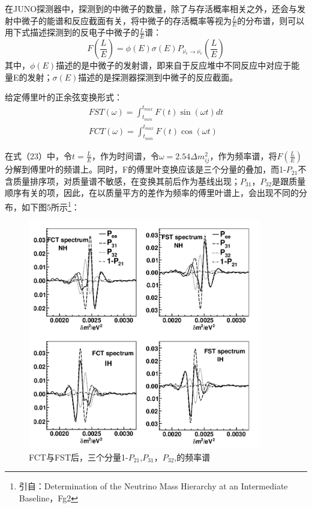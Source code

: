 \documentclass[10pt,a4paper]{article}
\begin{document}
在JUNO探测器中，探测到的中微子的数量，除了与存活概率相关之外，还会与发射中微子的能谱和反应截面有关，将中微子的存活概率等视为$\frac{L}{E}$的分布谱，则可以用下式描述探测到的反电子中微子的$\frac{L}{E}$谱：
\begin{equation}
F(\frac{L}{E})=\phi(E)\sigma(E)P_{\bar{\nu_e}\rightarrow\bar{\nu_e}}(\frac{L}{E})
\end{equation}
其中，$\phi(E)$描述的是中微子的发射谱，即来自于反应堆中不同反应中对应于能量E的发射；$\sigma(E)$描述的是探测器探测到中微子的反应截面。

给定傅里叶的正余弦变换形式：
\begin{equation}
\begin{split}
FST(\omega)=\int_{t_{min}}^{t_{max}}F(t)\sin(\omega t)dt\\
FCT(\omega)=\int_{t_{min}}^{t_{max}}F(t)\cos(\omega t)
\end{split}
\end{equation}


在式（23）中，令$t=\frac{L}{E}$，作为时间谱，令$\omega=2.54\Delta m_{ij}^2$，作为频率谱，将$F(\frac{L}{E})$分解到傅里叶的频谱上。同时，F的傅里叶变换应该是三个分量的叠加，而1-$P_{21}$不含质量排序项，对质量谱不敏感，在变换其前后作为基线出现；$P_{31}$，$P_{32}$是跟质量顺序有关的项，因此，在以质量平方的差作为频率的傅里叶谱上，会出现不同的分布，如下图5所示\footnote{引自：Determination of the Neutrino Mass Hierarchy at an Intermediate Baseline，Fg2}：
\begin{figure}[ht]
 \centering
 \includegraphics[height=10cm]{images/diff-P31-P32.png}
 \caption{FCT与FST后，三个分量1-$P_{21}$,$P_{31}$，$P_{32}$,的频率谱}
 \label{fig:singleblock}
\end{figure}
\end{document}
